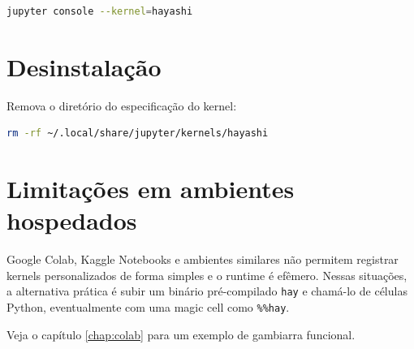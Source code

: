\begin{lstlisting}[style=inline, language=sh]
jupyter console --kernel=hayashi
\end{lstlisting}

\section{Desinstalação}

Remova o diretório do especificação do kernel:

\begin{lstlisting}[style=inline, language=sh]
rm -rf ~/.local/share/jupyter/kernels/hayashi
\end{lstlisting}

\section{Limitações em ambientes hospedados}

Google Colab, Kaggle Notebooks e ambientes similares não permitem registrar
kernels personalizados de forma simples e o runtime é efêmero. Nessas situações,
a alternativa prática é subir um binário pré-compilado \texttt{hay} e chamá-lo de
células Python, eventualmente com uma magic cell como \texttt{\%\%hay}.

Veja o capítulo \ref{chap:colab} para um exemplo de gambiarra funcional.
